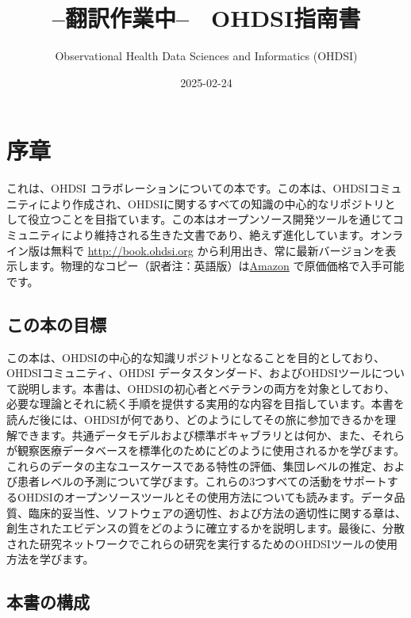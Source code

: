 \documentclass[
  11pt]{book}
\title{--翻訳作業中--　OHDSI指南書}
\author{Observational Health Data Sciences and Informatics (OHDSI)}
\date{2025-02-24}
\theoremstyle{definition}
\theoremstyle{definition}
\theoremstyle{definition}
\theoremstyle{definition}
\theoremstyle{remark}
\begin{document}
\maketitle

{
\setcounter{tocdepth}{1}
\tableofcontents
}
\chapter*{序章}\label{ux5e8fux7ae0}

これは、OHDSI コラボレーションについての本です。この本は、OHDSIコミュニティにより作成され、OHDSIに関するすべての知識の中心的なリポジトリとして役立つことを目指ています。この本はオープンソース開発ツールを通じてコミュニティにより維持される生きた文書であり、絶えず進化しています。オンライン版は無料で \url{http://book.ohdsi.org} から利用出き、常に最新バージョンを表示します。物理的なコピー（訳者注：英語版）は\href{https://www.amazon.com/OHDSI-Observational-Health-Sciences-Informatics/dp/1088855199}{Amazon} で原価価格で入手可能です。

\section*{この本の目標}\label{ux3053ux306eux672cux306eux76eeux6a19}

この本は、OHDSIの中心的な知識リポジトリとなることを目的としており、OHDSIコミュニティ、OHDSI データスタンダード、およびOHDSIツールについて説明します。本書は、OHDSIの初心者とベテランの両方を対象としており、必要な理論とそれに続く手順を提供する実用的な内容を目指しています。本書を読んだ後には、OHDSIが何であり、どのようにしてその旅に参加できるかを理解できます。共通データモデルおよび標準ボキャブラリとは何か、また、それらが観察医療データベースを標準化のためにどのように使用されるかを学びます。これらのデータの主なユースケースである特性の評価、集団レベルの推定、および患者レベルの予測について学びます。これらの3つすべての活動をサポートするOHDSIのオープンソースツールとその使用方法についても読みます。データ品質、臨床的妥当性、ソフトウェアの適切性、および方法の適切性に関する章は、創生されたエビデンスの質をどのように確立するかを説明します。最後に、分散された研究ネットワークでこれらの研究を実行するためのOHDSIツールの使用方法を学びます。

\section*{本書の構成}\label{ux672cux66f8ux306eux69cbux6210}
\end{document}
